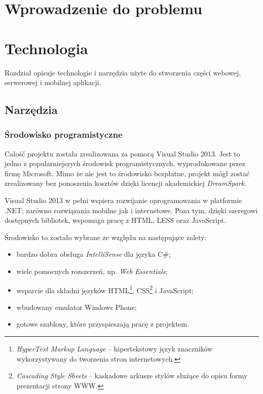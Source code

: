\documentclass{book}
\begin{document}
	
	
	
	\chapter{Wprowadzenie do problemu}
	\label{id:cha:wprowadzenie}
	
	\chapter{Technologia}
	\label{id:cha:technologia}
	
	Rozdział opisuje technologie i narzędzia użyte do stworzenia części webowej, serwerowej i mobilnej aplikacji.
	
		\section{Narzędzia}		
			\subsection{Środowisko programistyczne}
				
			Całość projektu została zrealizowana za pomocą Visual Studio 2013. Jest to jedno z popularniejszych środowisk programistycznych, wyprodukowane przez firmę Microsoft. Mimo że nie jest to środowisko bezpłatne, projekt mógł zostać zrealizowany bez ponoszenia kosztów dzięki licencji akademickiej \textit{DreamSpark}. 
			
			Visual Studio 2013 w pełni wspiera rozwijanie oprogramowania w platformie .NET; zarówno rozwiązania mobilne jak i internetowe. Poza tym, dzięki szeregowi dostępnych bibliotek, wspomaga pracę z HTML, LESS oraz JavaScript.
			
			Środowisko to zostało wybrane ze względu na następujące zalety:
			\begin{itemize}
				\item bardzo  dobra obsługa \textit{IntelliSense} dla języka C\#;
				\item wiele pomocnych rozszerzeń, np. \textit{Web Essentials};
				\item wsparcie dla składni języków HTML\footnote{\emph{HyperText Markup Language} -- hipertekstowy język znaczników wykorzystywany do tworzenia stron internetowych.}, CSS\footnote{\emph{Cascading Style Sheets} -- kaskadowe arkusze stylów służące do opisu formy prezentacji strony WWW.} i JavaScript;
				\item wbudowany emulator Windows Phone;
				\item gotowe szablony, które przyspieszają pracę z projektem.
			\end{itemize}
			
\end{document}
